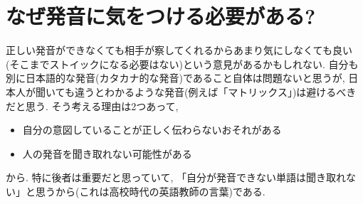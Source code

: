 \documentclass[12pt,a4j]{jsarticle}
\begin{document}
\section{なぜ発音に気をつける必要がある?}
正しい発音ができなくても相手が察してくれるからあまり気にしなくても良い(そこまでストイックになる必要はない)という意見があるかもしれない.
自分も別に日本語的な発音(カタカナ的な発音)であること自体は問題ないと思うが,
日本人が聞いても違うとわかるような発音(例えば「マトリックス」)は避けるべきだと思う.
そう考える理由は2つあって,
\begin{itemize}
\item 自分の意図していることが正しく伝わらないおそれがある
\item 人の発音を聞き取れない可能性がある
\end{itemize}
から.
特に後者は重要だと思っていて, 「自分が発音できない単語は聞き取れない」と思うから(これは高校時代の英語教師の言葉)である.
\end{document}
